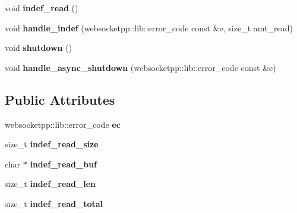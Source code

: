 \begin{DoxyCompactItemize}
\item 
void {\bfseries indef\+\_\+read} ()\hypertarget{structstub__con_a122900a3be17dcbd6cc693ef8c025358}{}\label{structstub__con_a122900a3be17dcbd6cc693ef8c025358}

\item 
void {\bfseries handle\+\_\+indef} (websocketpp\+::lib\+::error\+\_\+code const \&e, size\+\_\+t amt\+\_\+read)\hypertarget{structstub__con_a054f8943e3032fe19b3d9bf48bdf0039}{}\label{structstub__con_a054f8943e3032fe19b3d9bf48bdf0039}

\item 
void {\bfseries shutdown} ()\hypertarget{structstub__con_a206b67c35da3da4fed8bfb2e2e783993}{}\label{structstub__con_a206b67c35da3da4fed8bfb2e2e783993}

\item 
void {\bfseries handle\+\_\+async\+\_\+shutdown} (websocketpp\+::lib\+::error\+\_\+code const \&e)\hypertarget{structstub__con_ab1acd168c2d28834e21ff352759f9c66}{}\label{structstub__con_ab1acd168c2d28834e21ff352759f9c66}

\end{DoxyCompactItemize}
\subsection*{Public Attributes}
\begin{DoxyCompactItemize}
\item 
websocketpp\+::lib\+::error\+\_\+code {\bfseries ec}\hypertarget{structstub__con_a9e791dd7df34a3c59adb1255bf8ad531}{}\label{structstub__con_a9e791dd7df34a3c59adb1255bf8ad531}

\item 
size\+\_\+t {\bfseries indef\+\_\+read\+\_\+size}\hypertarget{structstub__con_a7874b39f63070e3f8d638ec08833fa32}{}\label{structstub__con_a7874b39f63070e3f8d638ec08833fa32}

\item 
char $\ast$ {\bfseries indef\+\_\+read\+\_\+buf}\hypertarget{structstub__con_a7c30a1651bfeda92ba5798f37fbab4e0}{}\label{structstub__con_a7c30a1651bfeda92ba5798f37fbab4e0}

\item 
size\+\_\+t {\bfseries indef\+\_\+read\+\_\+len}\hypertarget{structstub__con_a259aa44e4b056988d48838539a134db9}{}\label{structstub__con_a259aa44e4b056988d48838539a134db9}

\item 
size\+\_\+t {\bfseries indef\+\_\+read\+\_\+total}\hypertarget{structstub__con_adc048dddd9b964b03e937c69fbce1c8e}{}\label{structstub__con_adc048dddd9b964b03e937c69fbce1c8e}

\end{DoxyCompactItemize}
